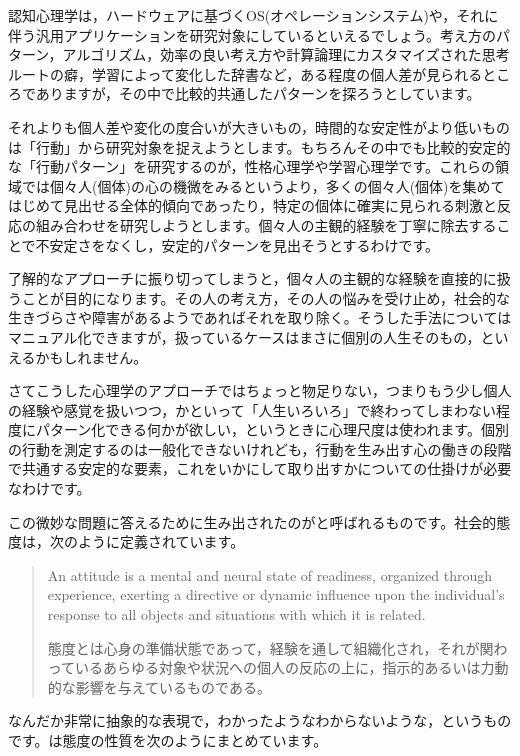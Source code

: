 \documentclass{ltjsbook}
\begin{document}
認知心理学は，ハードウェアに基づくOS(オペレーションシステム)や，それに伴う汎用アプリケーションを研究対象にしているといえるでしょう。考え方のパターン，アルゴリズム，効率の良い考え方や計算論理にカスタマイズされた思考ルートの癖，学習によって変化した辞書など，ある程度の個人差が見られるところでありますが，その中で比較的共通したパターンを探ろうとしています。

それよりも個人差や変化の度合いが大きいもの，時間的な安定性がより低いものは「行動」から研究対象を捉えようとします。もちろんその中でも比較的安定的な「行動パターン」を研究するのが，性格心理学や学習心理学です。これらの領域では個々人(個体)の心の機微をみるというより，多くの個々人(個体)を集めてはじめて見出せる全体的傾向であったり，特定の個体に確実に見られる刺激と反応の組み合わせを研究しようとします。個々人の主観的経験を丁寧に除去することで不安定さをなくし，安定的パターンを見出そうとするわけです。

了解的なアプローチに振り切ってしまうと，個々人の主観的な経験を直接的に扱うことが目的になります。その人の考え方，その人の悩みを受け止め，社会的な生きづらさや障害があるようであればそれを取り除く。そうした手法についてはマニュアル化できますが，扱っているケースはまさに個別の人生そのもの，といえるかもしれません。

さてこうした心理学のアプローチではちょっと物足りない，つまりもう少し個人の経験や感覚を扱いつつ，かといって「人生いろいろ」で終わってしまわない程度にパターン化できる何かが欲しい，というときに心理尺度は使われます。個別の行動を測定するのは一般化できないけれども，行動を生み出す心の働きの段階で共通する安定的な要素，これをいかにして取り出すかについての仕掛けが必要なわけです。

この微妙な問題に答えるために生み出されたのがと呼ばれるものです。社会的態度は，次のように定義されています。

\begin{quote}
    An attitude is a mental and neural state of readiness, organized through experience, exerting a directive or dynamic influence upon the individual's response to all objects and situations with which it is related.

    態度とは心身の準備状態であって，経験を通して組織化され，それが関わっているあらゆる対象や状況への個人の反応の上に，指示的あるいは力動的な影響を与えているものである\citep{Allport1935}。
\end{quote}

なんだか非常に抽象的な表現で，わかったようなわからないような，というものです。\citet{Fujihara2001}は態度の性質を次のようにまとめています。
\end{document}
